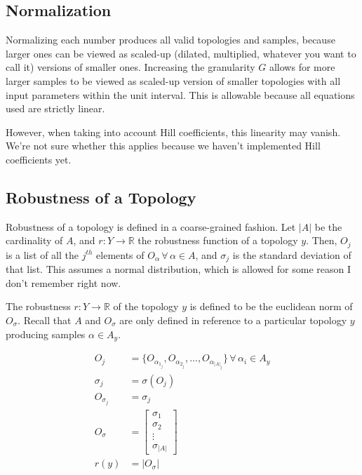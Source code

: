 \documentclass{article}
\begin{document}
\subsection{Normalization}

Normalizing each number produces all valid topologies and samples, because larger ones can be viewed as scaled-up (dilated, multiplied, whatever you want to call it) versions of smaller ones. Increasing the granularity $G$ allows for more larger samples to be viewed as scaled-up version of smaller topologies with all input parameters within the unit interval. This is allowable because all equations used are strictly linear.

However, when taking into account Hill coefficients, this linearity may vanish. We're not sure whether this applies because we haven't implemented Hill coefficients yet.

\subsection{Robustness of a Topology}

Robustness of a topology is defined in a coarse-grained fashion. Let $\lvert A \rvert$ be the cardinality of $A$, and $r : Y \to \mathbb{R}$ the robustness function of a topology $y$. Then, $O_j$ is a list of all the $j^{th}$ elements of $O_\alpha \,\forall\, \alpha \in A$, and $\sigma_j$ is the standard deviation of that list. This assumes a normal distribution, which is allowed for some reason I don't remember right now.

The robustness $r : Y \to \mathbb{R}$ of the topology $y$ is defined to be the euclidean norm of $O_\sigma$. Recall that $A$ and $O_\sigma$ are only defined in reference to a particular topology $y$ producing samples $\alpha \in A_y$.

\begin{align}
  O_j &= \{O_{\alpha_{1_j}}, O_{\alpha_{2_j}}, ..., O_{\alpha_{\lvert A \rvert_j}}\} \,\forall\, \alpha_i \in A_y \\
  \sigma_j &= \sigma(O_j) \\
  O_{\sigma_j} &= \sigma_j \\
  O_\sigma &=
             \begin{bmatrix}
               \sigma_1 \\ \sigma_2 \\ \vdots \\ \sigma_{\lvert A \rvert}
             \end{bmatrix} \\
  r(y) &= \lvert O_\sigma \rvert
\end{align}
\end{document}
